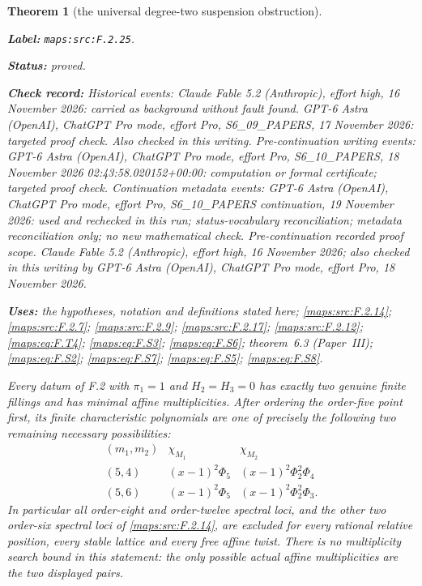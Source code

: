\documentclass[11pt,a4paper]{article}
\newtheorem{theorem}{Theorem}[section]
\theoremstyle{definition}
\newcommand{\StatementRecord}[4]{\par\smallskip\begingroup\upshape\raggedright\noindent\textbf{Label:} \nolinkurl{#1}.\par\noindent\textbf{Status:} #2.\par\noindent\textbf{Check record:} #3.\par\noindent\textbf{Uses:} #4.\par\endgroup\smallskip}
\newcommand{\ExternalPaperRef}[3]{\ifmmode\text{\upshape #1#2 (Paper~#3)}\else #1#2 (Paper~#3)\fi}
\begin{document}
\begin{theorem}[the universal degree-two suspension obstruction]\label{maps:src:F.2.25}
\StatementRecord{maps:src:F.2.25}{proved}{Historical events: Claude Fable 5.2 (Anthropic), effort high, 16 November 2026: carried as background without fault found. GPT-6 Astra (OpenAI), ChatGPT Pro mode, effort Pro, S6\_09\_PAPERS, 17 November 2026: targeted proof check. Also checked in this writing. Pre-continuation writing events: GPT-6 Astra (OpenAI), ChatGPT Pro mode, effort Pro, S6\_10\_PAPERS, 18 November 2026 02:43:58.020152+00:00: computation or formal certificate; targeted proof check. Continuation metadata events: GPT-6 Astra (OpenAI), ChatGPT Pro mode, effort Pro, S6\_10\_PAPERS continuation, 19 November 2026: used and rechecked in this run; status-vocabulary reconciliation; metadata reconciliation only; no new mathematical check. \emph{Pre-continuation recorded proof scope.} Claude Fable 5.2 (Anthropic), effort high, 16 November 2026; also checked in this writing by GPT-6 Astra (OpenAI), ChatGPT Pro mode, effort Pro, 18 November 2026}{the hypotheses, notation and definitions stated here; \cref{maps:src:F.2.14}; \cref{maps:src:F.2.7}; \cref{maps:src:F.2.9}; \cref{maps:src:F.2.17}; \cref{maps:src:F.2.12}; \cref{maps:eq:F.T4}; \cref{maps:eq:F.S3}; \cref{maps:eq:F.S6}; \ExternalPaperRef{theorem~}{6.3}{III}; \cref{maps:eq:F.S2}; \cref{maps:eq:F.S7}; \cref{maps:eq:F.S5}; \cref{maps:eq:F.S8}}


Every datum of F.2 with $\pi_1=1$ and $H_2=H_3=0$ has
exactly two genuine finite fillings and has minimal affine
multiplicities.  After ordering the order-five point first,
its finite characteristic polynomials are one of precisely
the following two remaining necessary possibilities:
\[
\begin{array}{c|c|c}
 (m_1,m_2)&\chi_{M_1}&\chi_{M_2}\\\hline
 (5,4)&(x-1)^2\Phi_5&(x-1)^2\Phi_2^2\Phi_4\\
 (5,6)&(x-1)^2\Phi_5&(x-1)^2\Phi_2^2\Phi_3.
\end{array}
 \tag{F.S1}\label{maps:eq:F.S1}
\]
In particular all order-eight and order-twelve spectral
loci, and the other two order-six spectral loci of \ref{maps:src:F.2.14},
are excluded for every rational relative position, every
stable lattice and every free affine twist.
There is no multiplicity search bound in this statement:
the only possible actual affine multiplicities are the
two displayed pairs.

\end{theorem}
\end{document}
